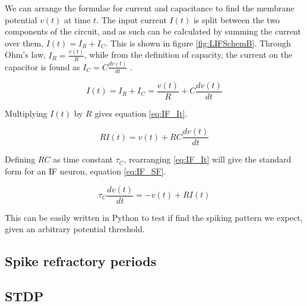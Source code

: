 We can arrange the formulae for current and capacitance to find the membrane
potential $v(t)$ at time $t$. The input current $I(t)$ is split between the two
components of the circuit, and as such can be calculated by summing the current
over them, $I(t) = I_R + I_C$. This is shown in figure \ref{fig:LIFSchemB}.
Through Ohm's law, $I_R = \frac{v(t)}{R}$, while from the definition of capacity,
the current on the capacitor is found as 
$I_C = C \frac{d v(t)}{d t}$ \autocite{gerstner_spiking_2002}. 
 
\begin{equation}\label{eq:IF_Itpre}
    I(t) = I_R + I_C = \frac{v(t)}{R} + C \frac{d v(t)}{d t}
\end{equation}

Multiplying $I(t)$
by $R$ gives equation \ref{eq:IF_It}.

\begin{equation}\label{eq:IF_It}
    R I(t) = v(t) + R C \frac{d v(t)}{d t}
\end{equation}

Defining $RC$ as time constant $\tau_C$, rearranging \ref{eq:IF_It} will
give the standard form for an IF neuron, equation \ref{eq:IF_SF}.

\begin{equation}\label{eq:IF_SF}
    \tau_C \frac{d v(t)}{d t} = - v(t) + R I(t)  
\end{equation}

This can be easily written in Python to test if find the spiking pattern we
expect, given an arbitrary potential threshold.









\subsection{Spike refractory periods}

\subsection{STDP}